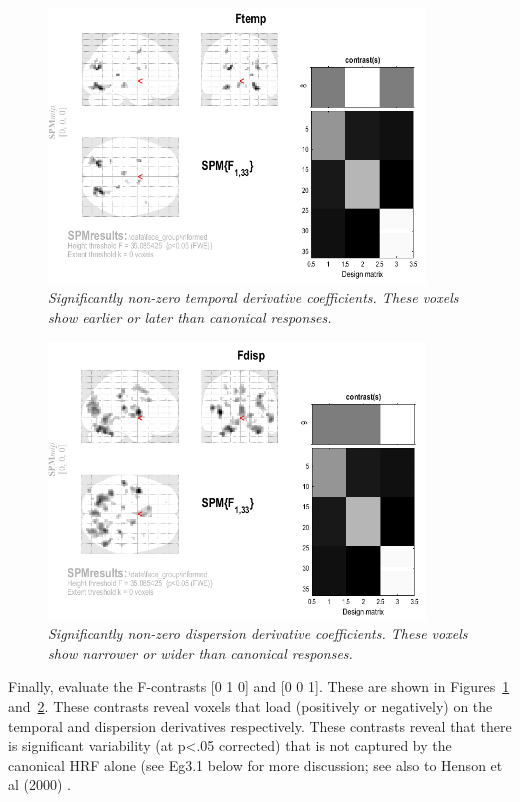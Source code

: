 \begin{figure}
\begin{center}
\includegraphics[width=100mm]{faces_group/Ftemp}
\caption{\em Significantly non-zero temporal derivative coefficients. These voxels show earlier or later than canonical responses. \label{informed_Ftemp}}
\end{center}
\end{figure}
\begin{figure}
\begin{center}
\includegraphics[width=100mm]{faces_group/Fdisp}
\caption{\em Significantly non-zero dispersion derivative coefficients. These voxels show narrower or wider than canonical responses. \label{informed_Fdisp}}
\end{center}
\end{figure}

	Finally, evaluate the F-contrasts [0 1 0] and [0 0 1]. These 
	are shown in Figures~\ref{informed_Ftemp} and~\ref{informed_Fdisp}.
These contrasts reveal voxels that load (positively or negatively) on the temporal and dispersion derivatives respectively. These contrasts reveal that there is significant variability (at p<.05 corrected) that is not captured by the canonical HRF alone (see Eg3.1 below for more discussion; see also to Henson et al (2000) \cite{rnah_basis}.

